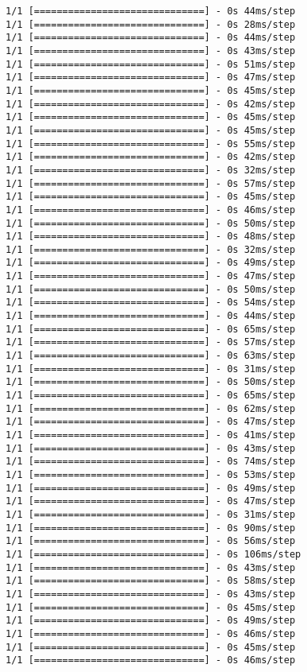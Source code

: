 \documentclass[11pt]{article}
\begin{document}
\begin{Verbatim}[commandchars=\\\{\}]
1/1 [==============================] - 0s 44ms/step
1/1 [==============================] - 0s 28ms/step
1/1 [==============================] - 0s 44ms/step
1/1 [==============================] - 0s 43ms/step
1/1 [==============================] - 0s 51ms/step
1/1 [==============================] - 0s 47ms/step
1/1 [==============================] - 0s 45ms/step
1/1 [==============================] - 0s 42ms/step
1/1 [==============================] - 0s 45ms/step
1/1 [==============================] - 0s 45ms/step
1/1 [==============================] - 0s 55ms/step
1/1 [==============================] - 0s 42ms/step
1/1 [==============================] - 0s 32ms/step
1/1 [==============================] - 0s 57ms/step
1/1 [==============================] - 0s 45ms/step
1/1 [==============================] - 0s 46ms/step
1/1 [==============================] - 0s 50ms/step
1/1 [==============================] - 0s 48ms/step
1/1 [==============================] - 0s 32ms/step
1/1 [==============================] - 0s 49ms/step
1/1 [==============================] - 0s 47ms/step
1/1 [==============================] - 0s 50ms/step
1/1 [==============================] - 0s 54ms/step
1/1 [==============================] - 0s 44ms/step
1/1 [==============================] - 0s 65ms/step
1/1 [==============================] - 0s 57ms/step
1/1 [==============================] - 0s 63ms/step
1/1 [==============================] - 0s 31ms/step
1/1 [==============================] - 0s 50ms/step
1/1 [==============================] - 0s 65ms/step
1/1 [==============================] - 0s 62ms/step
1/1 [==============================] - 0s 47ms/step
1/1 [==============================] - 0s 41ms/step
1/1 [==============================] - 0s 43ms/step
1/1 [==============================] - 0s 74ms/step
1/1 [==============================] - 0s 53ms/step
1/1 [==============================] - 0s 49ms/step
1/1 [==============================] - 0s 47ms/step
1/1 [==============================] - 0s 31ms/step
1/1 [==============================] - 0s 90ms/step
1/1 [==============================] - 0s 56ms/step
1/1 [==============================] - 0s 106ms/step
1/1 [==============================] - 0s 43ms/step
1/1 [==============================] - 0s 58ms/step
1/1 [==============================] - 0s 43ms/step
1/1 [==============================] - 0s 45ms/step
1/1 [==============================] - 0s 49ms/step
1/1 [==============================] - 0s 46ms/step
1/1 [==============================] - 0s 45ms/step
1/1 [==============================] - 0s 46ms/step

\end{Verbatim}
\end{document}
